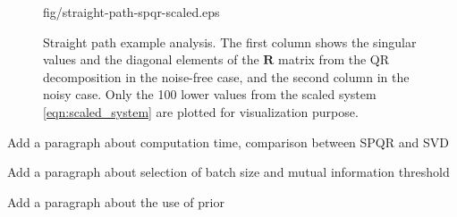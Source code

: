 \begin{figure}[t]
\begin{minipage}{.492\columnwidth}
    {fig/straight-path-spqr-scaled.eps}
\end{minipage}
\caption{Straight path example analysis. The first column shows the singular
  values and the diagonal elements of the $\mathbf{R}$ matrix from the QR
  decomposition in the noise-free case, and the second column in the noisy
  case. Only the 100 lower values from the scaled system
  \eqref{eqn:scaled_system} are plotted for visualization purpose.}
\label{fig:straight-path-analysis}
\end{figure}

Add a paragraph about computation time, comparison between SPQR and SVD

Add a paragraph about selection of batch size and mutual information threshold

Add a paragraph about the use of prior








